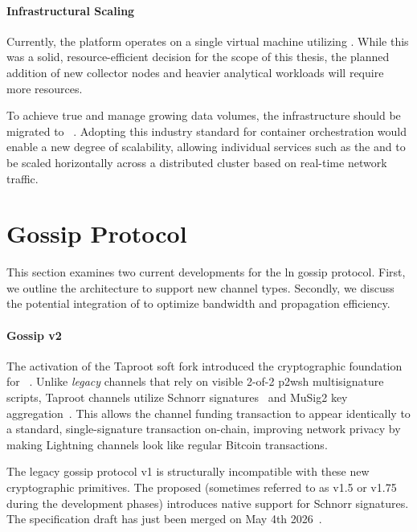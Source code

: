 \paragraph{Infrastructural Scaling}

Currently, the platform operates on a single virtual machine utilizing . 
While this was a solid, resource-efficient decision for the scope of this thesis, 
the planned addition of new collector nodes and heavier analytical workloads will require more resources. 

To achieve true  and manage growing data volumes, 
the infrastructure should be migrated to ~\cite{burns_borg_2016}. 
Adopting this industry standard for container orchestration would enable a new degree of scalability, 
allowing individual services such as the  and 
to be scaled horizontally across a distributed cluster based on real-time network traffic.


\section{Gossip Protocol}
\label{sec:ln-gossip-protocol}

This section examines two current developments for the \gls{ln} gossip protocol. 
First, we outline the  architecture to support new channel types. 
Secondly, we discuss the potential integration of  
to optimize bandwidth and propagation efficiency.


\paragraph{Gossip v2}
The activation of the Taproot soft fork introduced the cryptographic foundation for ~\cite{wuille_bip341_2020}. 
Unlike \textit{legacy} channels that rely on visible 2-of-2 \gls{p2wsh} multisignature scripts, 
Taproot channels utilize Schnorr signatures~\cite{wuille_bip340_2020} and MuSig2 key aggregation~\cite{nick_musig2_2021}. 
This allows the channel funding transaction to appear identically to a standard, single-signature transaction on-chain, 
improving network privacy by making Lightning channels look like regular Bitcoin transactions.

The legacy gossip protocol v1 is structurally incompatible with these new cryptographic primitives.
The proposed  (sometimes referred to as v1.5 or v1.75 during the development phases) 
introduces native support for Schnorr signatures. 
The specification draft has just been merged on May 4th 2026~\cite{mouton_extensionbolt_2023}.


